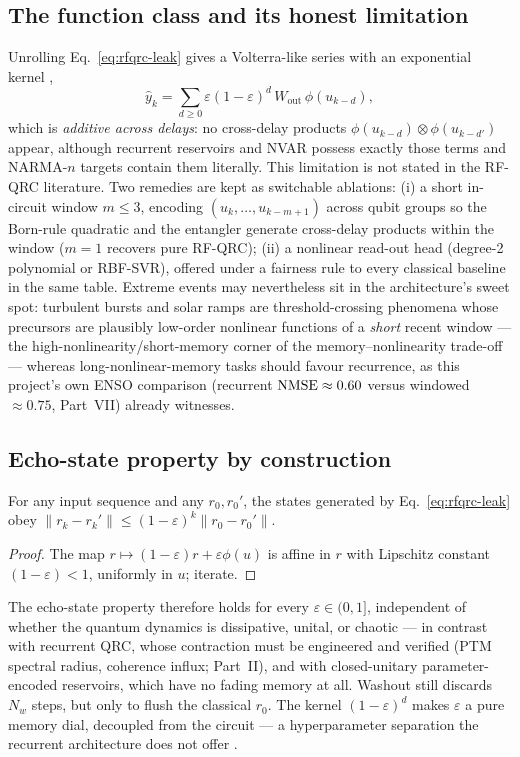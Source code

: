 \subsection{The function class and its honest limitation}
Unrolling Eq.~\eqref{eq:rfqrc-leak} gives a Volterra-like series with an
exponential kernel \citep{boyd1985fading},
\begin{equation}
\hat y_k=\sum_{d\ge 0}\varepsilon(1-\varepsilon)^d\,
W_{\mathrm{out}}\,\phi(u_{k-d}),
\label{eq:rfqrc-unroll}
\end{equation}
which is \emph{additive across delays}: no cross-delay products
$\phi(u_{k-d})\otimes\phi(u_{k-d'})$ appear, although recurrent reservoirs
and NVAR possess exactly those terms and NARMA-$n$ targets contain them
literally. This limitation is not stated in the RF-QRC literature. Two
remedies are kept as switchable ablations: (i) a short in-circuit window
$m\le3$, encoding $(u_k,\dots,u_{k-m+1})$ across qubit groups so the
Born-rule quadratic and the entangler generate cross-delay products within
the window ($m=1$ recovers pure RF-QRC); (ii) a nonlinear read-out head
(degree-2 polynomial or RBF-SVR), offered under a fairness rule to every
classical baseline in the same table. Extreme events may nevertheless sit in
the architecture's sweet spot: turbulent bursts and solar ramps are
threshold-crossing phenomena whose precursors are plausibly low-order
nonlinear functions of a \emph{short} recent window --- the
high-nonlinearity/short-memory corner of the memory--nonlinearity trade-off
\citep{dambre2012information} --- whereas long-nonlinear-memory tasks should
favour recurrence, as this project's own ENSO comparison (recurrent
$\mathrm{NMSE}\approx0.60$ versus windowed $\approx0.75$, Part~VII) already
witnesses.

\subsection{Echo-state property by construction}
\begin{proposition}
For any input sequence and any $r_0,r_0'$, the states generated by
Eq.~\eqref{eq:rfqrc-leak} obey
$\lVert r_k-r_k'\rVert\le(1-\varepsilon)^k\lVert r_0-r_0'\rVert$.
\end{proposition}
\begin{proof}
The map $r\mapsto(1-\varepsilon)r+\varepsilon\phi(u)$ is affine in $r$ with
Lipschitz constant $(1-\varepsilon)<1$, uniformly in $u$; iterate.
\end{proof}
The echo-state property therefore holds for every $\varepsilon\in(0,1]$,
independent of whether the quantum dynamics is dissipative, unital, or
chaotic --- in contrast with recurrent QRC, whose contraction must be
engineered and verified (PTM spectral radius, coherence influx; Part~II),
and with closed-unitary parameter-encoded reservoirs, which have no fading
memory at all. Washout still discards $N_w$ steps, but only to flush the
classical $r_0$. The kernel $(1-\varepsilon)^d$ makes $\varepsilon$ a pure
memory dial, decoupled from the circuit --- a hyperparameter separation the
recurrent architecture does not offer \citep{jaeger2007optimization}.

